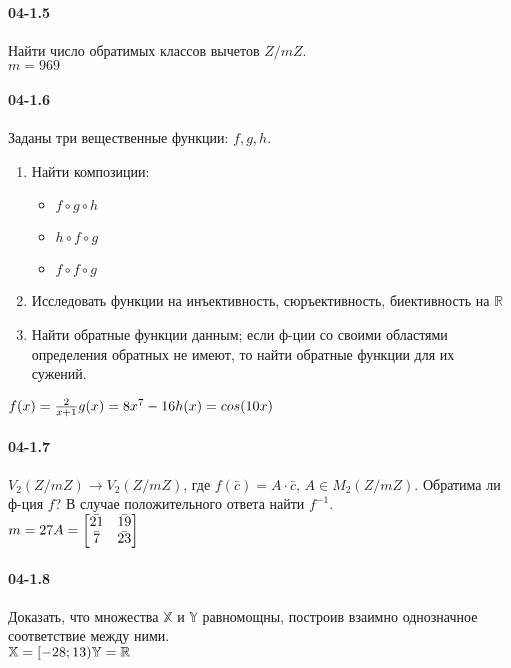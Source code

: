 \documentclass[12pt]{article}
\begin{document}
	\paragraph{04-1.5} Найти число обратимых классов вычетов $Z/mZ$.
	\\
	\ensuremath{
		m = 969
	}
	\clearpage
	\paragraph{04-1.6} Заданы три вещественные функции: $f, g, h$. \\
		\begin{enumerate}
			\item Найти композиции:
				\begin{itemize}
					\item $f \circ g \circ h$
					\item $h \circ f \circ g$
					\item $f \circ f \circ g$
				\end{itemize}
			\item Исследовать функции на инъективность, сюръективность, биективность на $\mathbb{R}$
			\item Найти обратные функции данным; если ф-ции со своими областями определения обратных не имеют, то найти обратные функции для их сужений.
		\end{enumerate}
	\ensuremath{
		f(x) = \frac{2}{x + 1}\\ \\
		g(x) = 8 x^{7} - 16 \\ \\
		h(x) = cos(10x)
	}
	\clearpage
	\paragraph{04-1.7} $V_{2}(Z/mZ) \longrightarrow V_{2}(Z/mZ)$, где $f(\bar{c}) = A \cdot \bar{c}$, $A \in M_{2}(Z/mZ)$. Обратима ли ф-ция $f$? В случае положительного ответа найти $f^{-1}$.
	\\
	\ensuremath{
		m = 27 \\ \\
		A = \begin{bmatrix}
			\bar{21} & \bar{19} \\
			\bar{7} & \bar{23}
		\end{bmatrix}
	}
	\clearpage
	\paragraph{04-1.8} Доказать, что множества $\mathbb{X}$ и $\mathbb{Y}$ равномощны, построив взаимно однозначное соответствие между ними.
	\\
	\ensuremath{
		\mathbb{X} = [ -28 ; 13 ) \\
		\mathbb{Y} = \mathbb{R}
	}
	\clearpage
\end{document}
